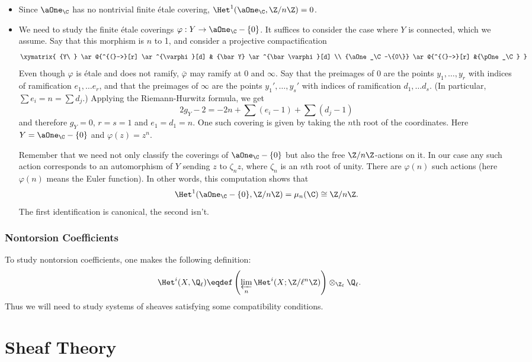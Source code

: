 \begin{itemize}
\item 
Since $\aOne_\C$ has no nontrivial finite \'etale covering, $\Het^1 (\aOne_\C, \Z/n\Z) = 0$.
\item
We need to study the finite \'etale coverings $\varphi: Y \to \aOne_\C-\{0\}$. It suffices to consider the case where $Y$ is connected, which we assume. Say that this morphism is $n$ to 1, and consider a projective compactification
$$
\xymatrix{
{Y\ } \ar@{^{(}->}[r] \ar^{\varphi}[d] & {\bar Y} \ar^{\bar\varphi}[d] \\
{\aOne_\C-\{0\}} \ar@{^{(}->}[r]  &{\pOne_\C}
}
$$
Even though $\varphi$ is \'etale and does not ramify, $\bar{\varphi}$ may ramify at 0 and $\infty$. Say that the preimages of 0 are the points $y_1, \dots, y_r$ with indices of ramification $e_1, \dots e_r$, and that the preimages of $\infty$ are the points $y_1', \dots, y_s'$ with indices of ramification $d_1, \dots d_s$. (In particular, $\sum e_i = n = \sum d_j$.) Applying the Riemann-Hurwitz formula, we get
$$
2 g_Y - 2 = -2n + \sum (e_i - 1) + \sum (d_j - 1)
$$
and therefore $g_Y = 0$, $r=s=1$ and $e_1 = d_1 = n$. One such covering is given by taking the $n$th root of the coordinates. Here $Y = {\aOne_\C-\{0\}}$ and $\varphi (z) = z^n$. 

Remember that we need not only classify the coverings of ${\aOne_\C-\{0\}}$ but also the free $\Z/n\Z$-actions on it. In our case any such action corresponds to an automorphism of $Y$ sending $z$ to $\zeta_n z$, where $\zeta_n$ is an $n$th root of unity. There are $\varphi(n)$ such actions (here $\varphi(n)$ means the Euler function). 
In other words, this computation shows that
$$
\Het^1 (\aOne_\C-\{0\}, \Z/n\Z) = \mu_n (\C) \cong \Z/n\Z.
$$
The first identification is canonical, the second isn't.
\end{itemize}

\subsubsection{Nontorsion Coefficients}

To study nontorsion coefficients, one makes the following definition:
$$
\Het^i (X, \Q_\ell) \eqdef \left( \varprojlim_n \Het^i (X; \Z/\ell^n\Z) \right) \otimes_{\Z_\ell} \Q_\ell.
$$
Thus we will need to study systems of sheaves satisfying some compatibility conditions.\section{Sheaf Theory} %


